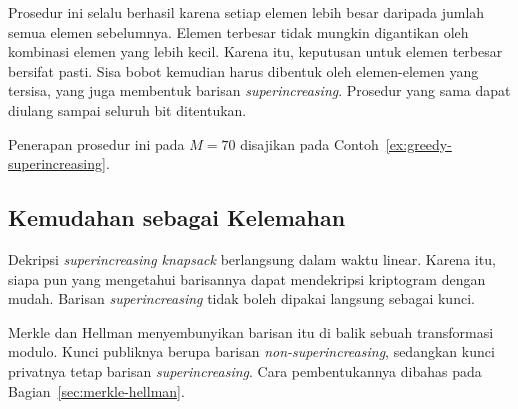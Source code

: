 Prosedur ini selalu berhasil karena setiap elemen lebih besar daripada jumlah
semua elemen sebelumnya. Elemen terbesar tidak mungkin digantikan oleh
kombinasi elemen yang lebih kecil. Karena itu, keputusan untuk elemen terbesar
bersifat pasti. Sisa bobot kemudian harus dibentuk oleh elemen-elemen yang
tersisa, yang juga membentuk barisan \textit{superincreasing}. Prosedur yang
sama dapat diulang sampai seluruh bit ditentukan.

Penerapan prosedur ini pada $M = 70$ disajikan pada
Contoh~\ref{ex:greedy-superincreasing}.

\subsection{Kemudahan sebagai Kelemahan}

Dekripsi \textit{superincreasing knapsack} berlangsung dalam waktu linear.
Karena itu, siapa pun yang mengetahui barisannya dapat mendekripsi kriptogram
dengan mudah. Barisan \textit{superincreasing} tidak boleh dipakai langsung
sebagai kunci.

Merkle dan Hellman menyembunyikan barisan itu di balik sebuah transformasi
modulo. Kunci publiknya berupa barisan \textit{non-superincreasing}, sedangkan
kunci privatnya tetap barisan \textit{superincreasing}. Cara pembentukannya
dibahas pada Bagian~\ref{sec:merkle-hellman}.
